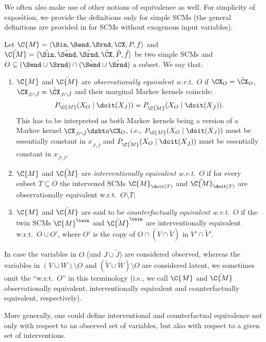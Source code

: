 We often also make use of other notions of equivalence as well.
For simplicity of exposition, we provide the definitions only for simple SCMs 
(the general definitions are provided in \cite{BFPM21} for SCMs without exogenous input variables).
\begin{Def}
  Let $\C{M} = \langle \Sin, \Send, \Srnd, \CX, P, f \rangle$ and
  $\tilde{\C{M}} = \langle \tilde{\Sin}, \tilde{\Send}, \tilde{\Srnd}, \tilde{\CX}, \tilde{P}, \tilde{f} \rangle$ be two simple SCMs
  and $O \subseteq (\Send \cup \Srnd) \cap (\tilde{\Send} \cup \tilde{\Srnd})$ a subset.
  We say that:
  \begin{enumerate}
    \item $\C{M}$ and $\tilde{\C{M}}$ are \emph{observationally equivalent w.r.t.\ $O$} if $\CX_O = \tilde{\CX}_O$, $\CX_{J \cap \tilde{J}} = \tilde{\CX}_{J \cap \tilde{J}}$ and their marginal Markov kernels coincide: 
      $$P_{\C{M}}(X_O \mid \doit(X_J)) = P_{\tilde{\C{M}}}(X_O \mid \doit(X_{\tilde J})).$$
    This has to be interpreted as both Markov kernels being a version of a Markov kernel $\CX_{J \cap \tilde{J}} \dshto \CX_O$,
    i.e., $P_{\C{M}}(X_O \mid \doit(X_J))$ must be essentially constant in $x_{J \setminus \tilde{J}}$ and
    $P_{\tilde{\C{M}}}(X_O \mid \doit(X_{\tilde{J}}))$ must be essentially constant in $x_{\tilde{J} \setminus J}$.
    \item $\C{M}$ and $\tilde{\C{M}}$ are \emph{interventionally equivalent w.r.t.\ $O$} if for every subset $T \subseteq O$ the intervened SCMs $\C{M}_{\doit(T)}$ and $\tilde{\C{M}}_{\doit(T)}$ are observationally equivalent w.r.t.\ $O \setminus T$;
    \item $\C{M}$ and $\tilde{\C{M}}$ are said to be \emph{counterfactually equivalent w.r.t.\ $O$} if the twin SCMs $\C{M}^\twin$ and $\tilde{\C{M}}^\twin$ are interventionally equivalent w.r.t.\ $O \cup O'$, where
    $O'$ is the copy of $O \cap (V \cap \tilde{V})$ in $V' \cap \tilde{V}'$.
  \end{enumerate}
  In case the variables in $O$ (and $J \cup \tilde{J}$) are considered observed, whereas the variables in 
  $(V \cup W) \setminus O$ and $(\tilde{V} \cup \tilde{W}) \setminus O$ are considered latent, 
  we sometimes omit the ``w.r.t.\ $O$'' in this terminology (i.e., we call $\C{M}$ and $\tilde{\C{M}}$ observationally equivalent, interventionally equivalent and counterfactually equivalent, respectively).
\end{Def}
More generally, one could define interventional and counterfactual equivalence not only with respect to an observed set of variables, but also with respect to a given set of interventions.

